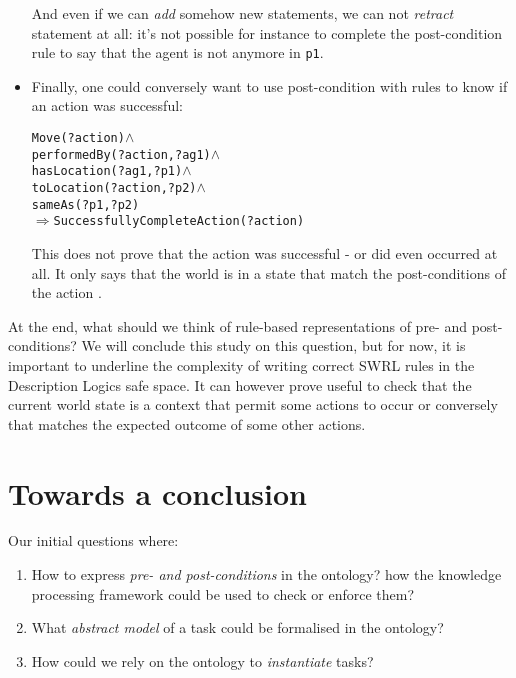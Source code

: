 \begin{itemize}
    And even if we can \emph{add} somehow new statements, we can not
    \emph{retract} statement at all: it's not possible for instance to complete
    the post-condition rule to say that the agent is not anymore in {\tt p1}.

    \item  Finally, one could conversely want to use post-condition with rules to
    know if an action was successful:


    \begin{alltt}

    Move(?action) \(\land\)
    performedBy(?action, ?ag1) \(\land\)
    hasLocation(?ag1, ?p1) \(\land\)
    toLocation(?action, ?p2) \(\land\)
    sameAs(?p1, ?p2)
    \(\Rightarrow\) SuccessfullyCompleteAction(?action)

    \end{alltt}

    This does not prove that the action was successful - or did even occurred at
    all. It only says that the world is in a state that match the post-conditions
    of the action .

\end{itemize}

At the end, what should we think of rule-based representations of pre- and
post-conditions? We will conclude this study on this question, but for now, it
is important to underline the complexity of writing correct SWRL rules in the
Description Logics safe space. It can however prove useful to check that the
current world state is a context that permit some actions to occur or
conversely that matches the expected outcome of some other actions.


\section{Towards a conclusion}

Our initial questions where:

\begin{enumerate}

    \item  How to express \emph{pre- and post-conditions} in the ontology? how
    the knowledge processing framework could be used to check or enforce them?

    \item  What \emph{abstract model} of a task could be formalised in the
    ontology?

    \item  How could we rely on the ontology to \emph{instantiate} tasks?

\end{enumerate}

